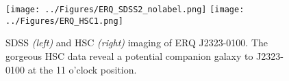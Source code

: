\documentclass[12pt]{article}
\begin{document}
\hspace{-2.5cm}
\begin{figure}[h]
  \begin{center}
    \hspace{-0.5cm}
    \texttt{[image: ../Figures/ERQ\_SDSS2\_nolabel.png]}
    \texttt{[image: ../Figures/ERQ\_HSC1.png]}
    \vspace{-10pt}
    \caption{
      \footnotesize
      SDSS {\it (left)} and HSC {\it (right)} imaging of ERQ
      J2323-0100.  The gorgeous HSC data reveal a potential companion galaxy
      to J2323-0100 at the 11 o'clock position.}
    \vspace{-14pt}
    \label{figtest-fig}
  \end{center}
\end{figure}









\clearpage

%
%
\describeobservations   %



%
%
\alttargets   %


%
%
\specialreq             %


%
%
\coordinatedobs %
\end{document}
